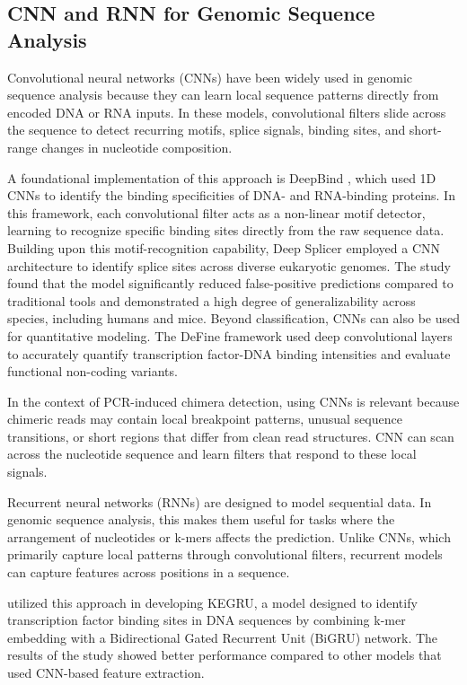 \subsection{CNN and RNN for Genomic Sequence Analysis}
Convolutional neural networks (CNNs) have been widely used in genomic sequence analysis because they can learn local sequence patterns directly from encoded DNA or RNA inputs. In these models, convolutional filters slide across the sequence to detect recurring motifs, splice signals, binding sites, and short-range changes in nucleotide composition.

A foundational implementation of this approach is DeepBind \citep{Alipanahi2015}, which used 1D CNNs to identify the binding specificities of DNA- and RNA-binding proteins. In this framework, each convolutional filter acts as a non-linear motif detector, learning to recognize specific binding sites directly from the raw sequence data. Building upon this motif-recognition capability, Deep Splicer \citep{FernandezCastillo2022} employed a CNN architecture to identify splice sites across diverse eukaryotic genomes. The study found that the model significantly reduced false-positive predictions compared to traditional tools and demonstrated a high degree of generalizability across species, including humans and mice. Beyond classification, CNNs can also be used for quantitative modeling. The DeFine framework \citep{Wang2018} used deep convolutional layers to accurately quantify transcription factor-DNA binding intensities and evaluate functional non-coding variants.

In the context of PCR-induced chimera detection, using CNNs is relevant because chimeric reads may contain local breakpoint patterns, unusual sequence transitions, or short regions that differ from clean read structures. CNN can scan across the nucleotide sequence and learn filters that respond to these local signals.

Recurrent neural networks (RNNs) are designed to model sequential data. In genomic sequence analysis, this makes them useful for tasks where the arrangement of nucleotides or k-mers affects the prediction. Unlike CNNs, which primarily capture local patterns through convolutional filters, recurrent models can capture features across positions in a sequence.

\citet{Shen2018} utilized this approach in developing KEGRU, a model designed to identify transcription factor binding sites in DNA sequences by combining k-mer embedding with a Bidirectional Gated Recurrent Unit (BiGRU) network. The results of the study showed better performance compared to other models that used CNN-based feature extraction.

